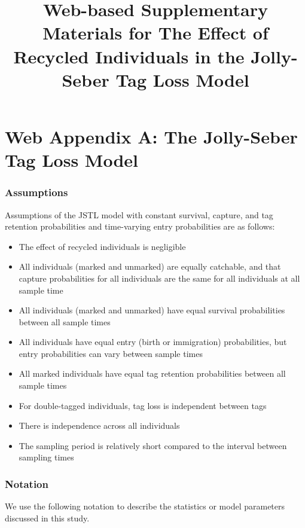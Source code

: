 \documentclass[]{article}
\title{Web-based Supplementary Materials for The Effect of Recycled Individuals
in the Jolly-Seber Tag Loss Model}
\author{}
\date{}
\providecommand{\tightlist}{%
  \setlength{\itemsep}{0pt}\setlength{\parskip}{0pt}}
\begin{document}
\maketitle

\section{Web Appendix A: The Jolly-Seber Tag Loss
Model}\label{web-appendix-a-the-jolly-seber-tag-loss-model}

\subsubsection{Assumptions}\label{assumptions}

Assumptions of the JSTL model with constant survival, capture, and tag
retention probabilities and time-varying entry probabilities are as
follows:

\begin{itemize}
\tightlist
\item
  The effect of recycled individuals is negligible
\item
  All individuals (marked and unmarked) are equally catchable, and that
  capture probabilities for all individuals are the same for all
  individuals at all sample time
\item
  All individuals (marked and unmarked) have equal survival
  probabilities between all sample times
\item
  All individuals have equal entry (birth or immigration) probabilities,
  but entry probabilities can vary between sample times
\item
  All marked individuals have equal tag retention probabilities between
  all sample times
\item
  For double-tagged individuals, tag loss is independent between tags
\item
  There is independence across all individuals
\item
  The sampling period is relatively short compared to the interval
  between sampling times
\end{itemize}

\subsubsection{Notation}\label{notation}

We use the following notation to describe the statistics or model
parameters discussed in this study.
\end{document}
